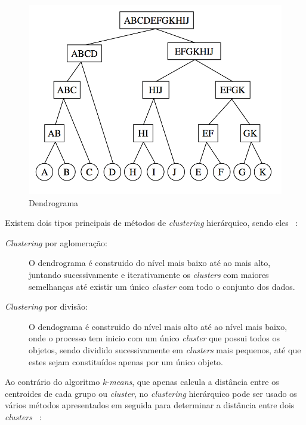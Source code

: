 \begin{figure}[h]
\centering
\includegraphics[width=0.6\linewidth]{./figures/hierarquico}
\caption{Dendrograma~\citet{Bramer2007}}
\label{fig:hierarquico}
\end{figure}

Existem dois tipos principais de métodos de \textit{clustering} hierárquico, sendo eles~\citet{Liu2011} :

\begin{description}
\item[\textit{Clustering} por aglomeração:] O dendrograma é construido do nível mais baixo até ao mais alto, juntando sucessivamente e iterativamente os \textit{clusters} com maiores semelhanças até existir um único \textit{cluster} com todo o conjunto dos dados.

\item[\textit{Clustering} por divisão:] O dendograma é construido do nível mais alto até ao nível mais baixo, onde o processo tem inicio com um único \textit{cluster} que possui todos os objetos, sendo dividido sucessivamente em \textit{clusters} mais pequenos, até que estes sejam constituídos apenas por um único objeto.
\end{description}

Ao contrário do algoritmo \textit{k-means}, que apenas calcula a distância entre os centroides de cada grupo ou \textit{cluster}, no \textit{clustering} hierárquico pode ser usado os vários métodos  apresentados em seguida para determinar a distância entre dois \textit{clusters}~\citet{Liu2011} : 

